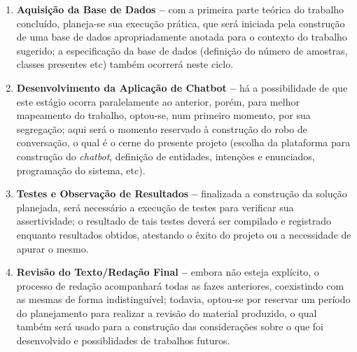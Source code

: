 \begin{enumerate}
    \item \textbf{Aquisição da Base de Dados --} com a primeira parte teórica do trabalho concluído, planeja-se sua execução prática, que será iniciada pela construção de uma base de dados apropriadamente anotada para o contexto do trabalho sugerido; a especificação da base de dados (definição do número de amostras, classes presentes etc) também ocorrerá neste ciclo.
    \item \textbf{Desenvolvimento da Aplicação de Chatbot --} há a possibilidade de que este estágio ocorra paralelamente ao anterior, porém, para melhor mapeamento do trabalho, optou-se, num primeiro momento, por sua  segregação; aqui será o momento reservado à construção do robo de conversação, o qual é o cerne do presente projeto (escolha da plataforma para construção do \textit{chatbot}, definição de entidades, intenções e enunciados, programação do sistema, etc).
    \item \textbf{Testes e Observação de Resultados --} finalizada a construção da solução planejada, será necessário a execução de testes para verificar sua assertividade; o resultado de tais testes deverá ser compilado e registrado enquanto resultados obtidos, atestando o êxito do projeto ou a necessidade de apurar o mesmo. 
    \item \textbf{Revisão do Texto/Redação Final --} embora não esteja explícito, o processo de redação acompanhará todas as fazes anteriores, coexistindo com as mesmas de forma indistinguível; todavia, optou-se por reservar um período do planejamento para realizar a revisão do material produzido, o qual também será usado para a construção das considerações sobre o que foi desenvolvido e possiblidades de trabalhos futuros.
\end{enumerate}